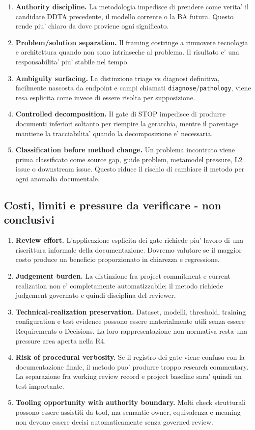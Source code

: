 \documentclass[11pt,a4paper]{article}
\begin{document}
\begin{enumerate}
  \item \textbf{Authority discipline.} La metodologia impedisce di prendere come verita' il candidate DDTA precedente, il modello corrente o la BA futura. Questo rende piu' chiaro da dove proviene ogni significato.
  \item \textbf{Problem/solution separation.} Il framing costringe a rimuovere tecnologia e architettura quando non sono intrinseche al problema. Il risultato e' una responsabilita' piu' stabile nel tempo.
  \item \textbf{Ambiguity surfacing.} La distinzione triage vs diagnosi definitiva, facilmente nascosta da endpoint e campi chiamati \texttt{diagnose}/\texttt{pathology}, viene resa esplicita come \NS{} invece di essere risolta per supposizione.
  \item \textbf{Controlled decomposition.} Il gate di STOP impedisce di produrre documenti inferiori soltanto per riempire la gerarchia, mentre il parentage mantiene la tracciabilita' quando la decomposizione e' necessaria.
  \item \textbf{Classification before method change.} Un problema incontrato viene prima classificato come source gap, guide problem, metamodel pressure, L2 issue o downstream issue. Questo riduce il rischio di cambiare il metodo per ogni anomalia documentale.
\end{enumerate}

\subsection{Costi, limiti e pressure da verificare - non conclusivi}

\begin{enumerate}
  \item \textbf{Review effort.} L'applicazione esplicita dei gate richiede piu' lavoro di una riscrittura informale della documentazione. Dovremo valutare se il maggior costo produce un beneficio proporzionato in chiarezza e regressione.
  \item \textbf{Judgement burden.} La distinzione fra project commitment e current realization non e' completamente automatizzabile; il metodo richiede judgement governato e quindi disciplina del reviewer.
  \item \textbf{Technical-realization preservation.} Dataset, modelli, threshold, training configuration e test evidence possono essere materialmente utili senza essere Requirements o Decisions. La loro rappresentazione non normativa resta una pressure area aperta nella R4.
  \item \textbf{Risk of procedural verbosity.} Se il registro dei gate viene confuso con la documentazione finale, il metodo puo' produrre troppo research commentary. La separazione fra working review record e project baseline sara' quindi un test importante.
  \item \textbf{Tooling opportunity with authority boundary.} Molti check strutturali possono essere assistiti da tool, ma semantic owner, equivalenza e meaning non devono essere decisi automaticamente senza governed review.
\end{enumerate}
\end{document}

